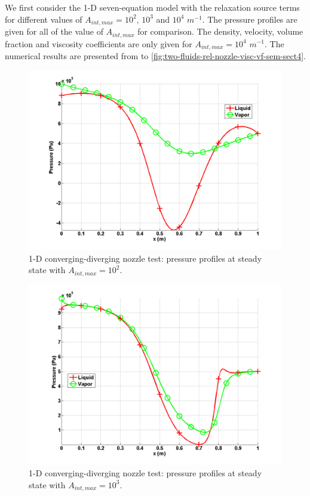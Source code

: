 We first consider the 1-D seven-equation model with the relaxation source terms for different values of $A_{int,max} = 10^2 \text{, } 10^3$ and $10^4$ $m^{-1}$. The pressure profiles are given for all of the value of $A_{int,max}$ for comparison. The density, velocity, volume fraction and viscosity coefficients are only given for $A_{int,max} = 10^4$ $m^{-1}$. The numerical results are presented from  to \ref{fig:two-fluids-rel-nozzle-visc-vf-sem-sect4}.
%
\begin{figure}[H]
\centering
\includegraphics[width=\textwidth]{figures/SEM/Aint1e2_two_phases_pressure.png}
\caption{1-D converging-diverging nozzle test: pressure profiles at steady state with $A_{int,max} = 10^2$.}
\label{fig:two-fluids-rel-nozzle-press-Aint2-sem-sect4}
\end{figure}
%
\begin{figure}[H]
\centering
\includegraphics[width=\textwidth]{figures/SEM/Aint1e3_two_phases_pressure.png}
\caption{1-D converging-diverging nozzle test: pressure profiles at steady state with $A_{int,max} = 10^3$.}
\label{fig:two-fluids-rel-nozzle-press-Aint3-sem-sect4}
\end{figure}
